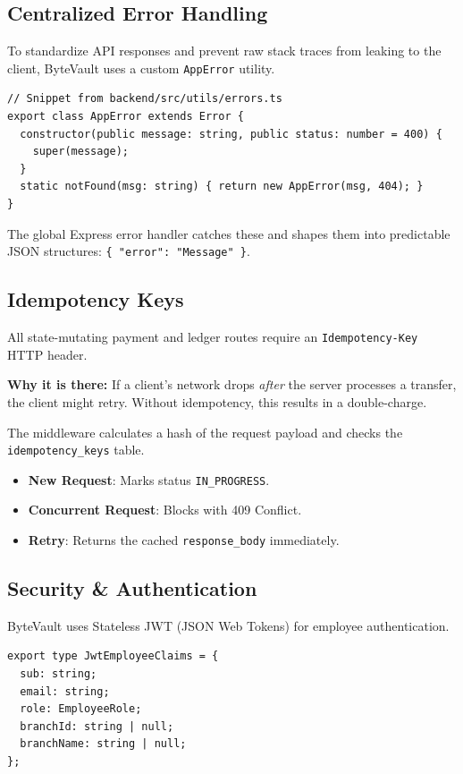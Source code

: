 \subsection{Centralized Error Handling}
To standardize API responses and prevent raw stack traces from leaking to the client, ByteVault uses a custom \texttt{AppError} utility.

\begin{lstlisting}[style=typescript]
// Snippet from backend/src/utils/errors.ts
export class AppError extends Error {
  constructor(public message: string, public status: number = 400) {
    super(message);
  }
  static notFound(msg: string) { return new AppError(msg, 404); }
}
\end{lstlisting}

The global Express error handler catches these and shapes them into predictable JSON structures: \texttt{\{ "error": "Message" \}}.

\subsection{Idempotency Keys}
All state-mutating payment and ledger routes require an \texttt{Idempotency-Key} HTTP header. 

\textbf{Why it is there:} If a client's network drops \textit{after} the server processes a transfer, the client might retry. Without idempotency, this results in a double-charge.

The middleware calculates a hash of the request payload and checks the \texttt{idempotency\_keys} table. 
\begin{itemize}
    \item \textbf{New Request}: Marks status \texttt{IN\_PROGRESS}.
    \item \textbf{Concurrent Request}: Blocks with 409 Conflict.
    \item \textbf{Retry}: Returns the cached \texttt{response\_body} immediately.
\end{itemize}

\subsection{Security \& Authentication}
ByteVault uses Stateless JWT (JSON Web Tokens) for employee authentication. 

\begin{lstlisting}[style=typescript]
export type JwtEmployeeClaims = {
  sub: string;
  email: string;
  role: EmployeeRole;
  branchId: string | null;
  branchName: string | null;
};
\end{lstlisting}


